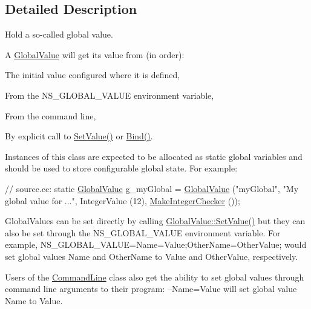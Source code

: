 \subsection{Detailed Description}
Hold a so-\/called \textquotesingle{}global value\textquotesingle{}. 

A \hyperlink{classns3_1_1GlobalValue}{Global\+Value} will get its value from (in order)\+:
\begin{DoxyItemize}
\item The initial value configured where it is defined,
\item From the {\ttfamily N\+S\+\_\+\+G\+L\+O\+B\+A\+L\+\_\+\+V\+A\+L\+UE} environment variable,
\item From the command line,
\item By explicit call to \hyperlink{classns3_1_1GlobalValue_ac719e4b4614ccb8199e5ee97d9a5d303}{Set\+Value()} or \hyperlink{classns3_1_1GlobalValue_a4fe56773b98d1047cd50e974256fd14a}{Bind()}.
\end{DoxyItemize}

Instances of this class are expected to be allocated as static global variables and should be used to store configurable global state. For example\+: 
\begin{DoxyCode}
\textcolor{comment}{// source.cc:}
\textcolor{keyword}{static} \hyperlink{classns3_1_1GlobalValue_ae47d892d6a279694b0c591f960e34538}{GlobalValue} g\_myGlobal =
  \hyperlink{classns3_1_1GlobalValue_ae47d892d6a279694b0c591f960e34538}{GlobalValue} (\textcolor{stringliteral}{"myGlobal"}, \textcolor{stringliteral}{"My global value for ..."},
               IntegerValue (12),
               \hyperlink{namespacens3_a8ecbab8d1cca8a427a4c122f43e164d2}{MakeIntegerChecker} ());
\end{DoxyCode}


Global\+Values can be set directly by calling \hyperlink{classns3_1_1GlobalValue_ac719e4b4614ccb8199e5ee97d9a5d303}{Global\+Value\+::\+Set\+Value()} but they can also be set through the {\ttfamily N\+S\+\_\+\+G\+L\+O\+B\+A\+L\+\_\+\+V\+A\+L\+UE} environment variable. For example, {\ttfamily N\+S\+\_\+\+G\+L\+O\+B\+A\+L\+\_\+\+V\+A\+L\+UE=\textquotesingle{}Name=Value};Other\+Name=Other\+Value;\textquotesingle{} would set global values {\ttfamily Name} and {\ttfamily Other\+Name} to {\ttfamily Value} and {\ttfamily Other\+Value}, respectively.

Users of the \hyperlink{classns3_1_1CommandLine}{Command\+Line} class also get the ability to set global values through command line arguments to their program\+: {\ttfamily --Name=Value} will set global value {\ttfamily Name} to {\ttfamily Value}. 

